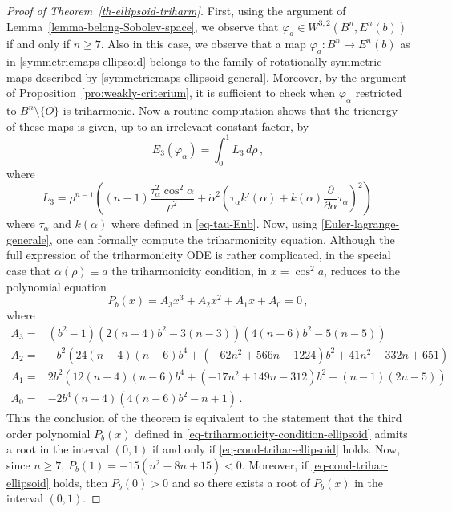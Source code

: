 \documentclass[11pt]{amsart}
\theoremstyle{plain}
\theoremstyle{definition}
\numberwithin{equation}{section}
\numberwithin{equation}{section}
\begin{document}
\begin{proof}[Proof of Theorem~\ref{th-ellipsoid-triharm}]
First, using the argument of Lemma~\ref{lemma-belong-Sobolev-space}, we observe that $\varphi_a \in  W^{3,2}\left ( B^n,E^n(b) \right )$ if and only if $n \geq 7$.
Also in this case, we observe that a map $\varphi_a:B^n \to E^n(b)$ as in \eqref{symmetricmaps-ellipsoid} belongs to the family of rotationally symmetric maps described by \eqref{symmetricmaps-ellipsoid-general}. Moreover, by the argument of Proposition~\ref{pro:weakly-criterium}, it is sufficient to check when $\varphi_{\alpha}$ restricted to $B^n\setminus\{O\}$ is triharmonic. Now a routine computation shows that the trienergy of these maps is given, up to an irrelevant constant factor, by
\begin{equation}\label{eq-bienergy-ellipsoid}
E_3\left( \varphi_\alpha \right )=\int_0^1 L_3\,d\rho \,,
\end{equation}
where
\[
L_3= \rho^{n-1} \left((n-1) \frac{\tau^2_{\alpha}  \cos^2 \alpha}{\rho^2}+ {\dot\alpha}^2\left(\tau_{\alpha}k'(\alpha)+k(\alpha) \frac{\partial}{\partial\alpha}{{\tau}_{\alpha}}\right)^2\right)\,
\]
where $\tau_\alpha$ and $k(\alpha)$ where defined in \eqref{eq-tau-Enb}. Now, using \eqref{Euler-lagrange-generale}, one can formally compute the triharmonicity equation. Although the full expression of the triharmonicity ODE is rather complicated, in the special case that $\alpha(\rho)\equiv a$ the triharmonicity condition, in $x=\cos^2 a$, reduces to the polynomial equation
\begin{equation}\label{eq-triharmonicity-condition-ellipsoid}
P_{b}(x)=A_3 x^3+A_2 x^2+A_1 x+A_0=0 \,,
\end{equation}
where
{\small
\[
\begin{split}
A_3=&(b^2-1)  \left(2(n-4) b^2-3 (n-3)\right) \left(4 (n-6) b^2-5 (n-5)\right)\\
A_2=&-b^2 \left(24 (n-4) (n-6)b^4 + (-62 n^2+566 n-1224)b^2+41 n^2-332 n+651\right)\\
A_1=&2 b^2 \left(12 (n-4) (n-6) b^4+(-17 n^2+149 n-312)b^2+(n-1) (2 n-5)\right)\\
A_0=&-2 b^4 (n-4) \left(4(n-6) b^2-n+1\right)\,.
\end{split}
\]
}
Thus the conclusion of the theorem is equivalent to the statement that the third order polynomial $P_b(x)$ defined in \eqref{eq-triharmonicity-condition-ellipsoid} admits a root in the interval $(0,1)$  if and only if \eqref{eq-cond-trihar-ellipsoid} holds. Now, since $n \geq 7$, $P_b(1)=-15 \left(n^2-8 n+15\right)<0$. Moreover, if \eqref{eq-cond-trihar-ellipsoid} holds, then $P_b(0)>0$ and so there exists a root of $P_b(x)$
in the interval $(0,1)$.


\end{proof}
\end{document}
